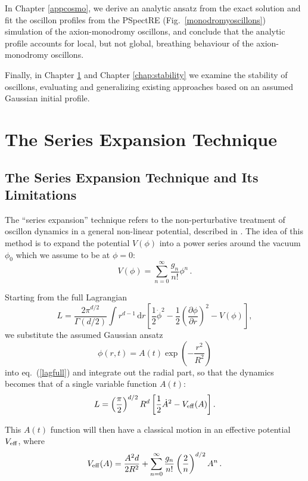 \documentclass[11pt]{book}
\begin{document}
In Chapter \ref{appcosmo}, we derive an analytic ansatz from the exact solution and fit the oscillon profiles from the PSpectRE (Fig.~\ref{monodromyoscillons}) simulation of the axion-monodromy oscillons, and conclude that the analytic profile accounts for local, but not global, breathing behaviour of the axion-monodromy oscillons.

Finally, in Chapter \ref{nonpertprob} and Chapter \ref{chap:stability} we examine the stability of oscillons, evaluating and generalizing existing approaches based on an assumed Gaussian initial profile.

\chapter{The Series Expansion Technique}\label{nonpertprob}
\section{The Series Expansion Technique and Its Limitations}
The ``series expansion'' technique refers to the non-perturbative treatment of oscillon dynamics in a general non-linear potential, described in \cite{PhysRevD.80.125037, Gleiser:2008ty}. The idea of this method is to expand the potential $V(\phi)$ into a power series around the vacuum $\phi_0$ which we assume to be at $\phi=0$:
\begin{equation}
  V(\phi)=\sum_{n=0}^\infty \frac{g_n}{n!}\phi^n\,.
\end{equation}

Starting from the full Lagrangian
\begin{equation}\label{lagfull}
    L = \frac{2\pi^{d/2}}{\Gamma(d/2)}\int r^{d-1}\,\mathrm{d}r\left[\frac{1}{2}\dot{\phi}^2 -
      \frac{1}{2}\left(\frac{\partial\phi}{\partial r}\right)^2-V(\phi)\right],
\end{equation}
we substitute the assumed Gaussian ansatz
\begin{equation}
  \phi(r,t) = A(t) \exp\left(-\frac{r^2}{R^2}\right)
\end{equation}
into eq.~(\ref{lagfull}) and integrate out the radial part, so that the dynamics becomes that of a single variable function $A(t)$:
\begin{equation}
  L= \left(\frac{\pi}{2}\right)^{d/2}R^d\left[\frac{1}{2}\dot{A}^2 - V_{\rm eff}(A)\right].
\end{equation}

This $A(t)$ function will then have a classical motion in an effective potential $V_{\rm eff}$, where
\begin{equation}\label{effpot}
  V_{\rm eff}(A) = \frac{A^2d}{2R^2} +
  \sum_{n=0}^\infty \frac{g_n}{n!}\left(\frac{2}{n}\right)^{d/2} A^n\,.
\end{equation}
\end{document}
